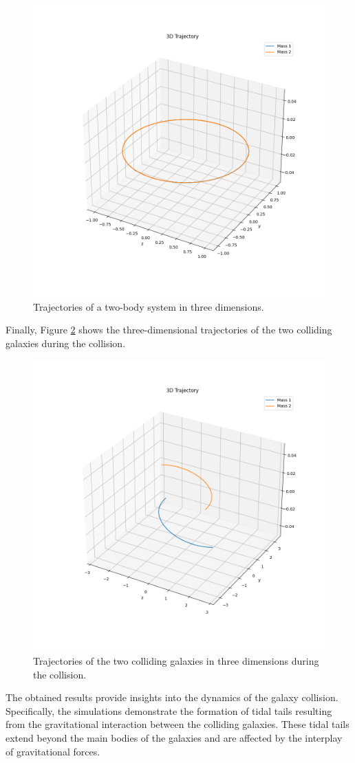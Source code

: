 \documentclass[reprint, amsmath, amssymb, aps]{revtex4-2}
\begin{document}
\begin{figure}[htb]
    \centering
    \includegraphics[width=0.7\columnwidth]{figures/3.png}
    \caption{Trajectories of a two-body system in three dimensions.}
    \label{fig:3d}
\end{figure}

Finally, Figure \ref{fig:collision} shows the three-dimensional trajectories of the two colliding galaxies during the collision.

\begin{figure}[htb]
    \centering
    \includegraphics[width=0.7\columnwidth]{figures/4.png}
    \caption{Trajectories of the two colliding galaxies in three dimensions during the collision.}
    \label{fig:collision}
\end{figure}

The obtained results provide insights into the dynamics of the galaxy collision. Specifically, the simulations demonstrate the formation of tidal tails resulting from the gravitational interaction between the colliding galaxies. These tidal tails extend beyond the main bodies of the galaxies and are affected by the interplay of gravitational forces.
\end{document}
